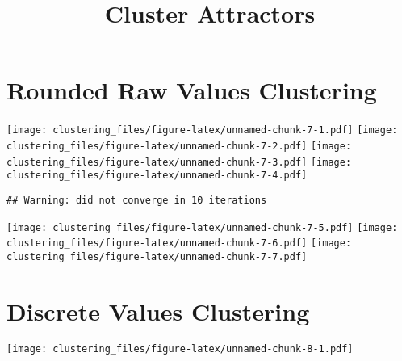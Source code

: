 \documentclass[]{article}
\title{Cluster Attractors}
\author{}
\date{}
\begin{document}
\maketitle

\hypertarget{rounded-raw-values-clustering}{%
\section{Rounded Raw Values
Clustering}\label{rounded-raw-values-clustering}}

\texttt{[image: clustering\_files/figure-latex/unnamed-chunk-7-1.pdf]}
\texttt{[image: clustering\_files/figure-latex/unnamed-chunk-7-2.pdf]}
\texttt{[image: clustering\_files/figure-latex/unnamed-chunk-7-3.pdf]}
\texttt{[image: clustering\_files/figure-latex/unnamed-chunk-7-4.pdf]}

\begin{verbatim}
## Warning: did not converge in 10 iterations
\end{verbatim}

\texttt{[image: clustering\_files/figure-latex/unnamed-chunk-7-5.pdf]}
\texttt{[image: clustering\_files/figure-latex/unnamed-chunk-7-6.pdf]}
\texttt{[image: clustering\_files/figure-latex/unnamed-chunk-7-7.pdf]}

\hypertarget{discrete-values-clustering}{%
\section{Discrete Values Clustering}\label{discrete-values-clustering}}

\texttt{[image: clustering\_files/figure-latex/unnamed-chunk-8-1.pdf]}
\end{document}
